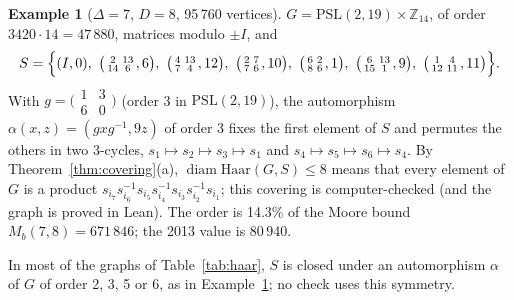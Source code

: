 \documentclass[11pt]{amsart}
\theoremstyle{definition}
\newtheorem{example}[theorem]{Example}
\theoremstyle{remark}
\numberwithin{equation}{section}
\newcommand{\Z}{\mathbb Z}
\newcommand{\Mb}{M_b}
\newcommand{\diam}{\operatorname{diam}}
\newcommand{\PSL}{\mathrm{PSL}}
\begin{document}
\begin{example}[$\Delta=7$, $D=8$, 95\,760 vertices]\label{ex:haar78}
$G=\PSL(2,19)\times\Z_{14}$, of order $3420\cdot14=47\,880$, matrices modulo $\pm I$, and
\[
S=\Bigl\{(I,0),\ \bigl(\begin{smallmatrix}2&13\\14&6\end{smallmatrix},6\bigr),\ \bigl(\begin{smallmatrix}4&13\\7&4\end{smallmatrix},12\bigr),\
\bigl(\begin{smallmatrix}2&7\\7&6\end{smallmatrix},10\bigr),\ \bigl(\begin{smallmatrix}6&2\\8&6\end{smallmatrix},1\bigr),\
\bigl(\begin{smallmatrix}6&13\\15&1\end{smallmatrix},9\bigr),\ \bigl(\begin{smallmatrix}1&4\\12&11\end{smallmatrix},11\bigr)\Bigr\}.
\]
With $g=\bigl(\begin{smallmatrix}1&3\\6&0\end{smallmatrix}\bigr)$ (order 3 in $\PSL(2,19)$), the automorphism
$\alpha(x,z)=(gxg^{-1},9z)$ of order 3 fixes the first element of $S$ and permutes the others in two 3-cycles, $s_1\mapsto
s_2\mapsto s_3\mapsto s_1$ and $s_4\mapsto s_5\mapsto s_6\mapsto s_4$. By Theorem~\ref{thm:covering}(a), $\diam \mathrm{Haar}(G,S)\le8$ means
that every element of $G$ is a product $s_{i_7}s_{i_6}^{-1}s_{i_5}s_{i_4}^{-1}s_{i_3}s_{i_2}^{-1}s_{i_1}$; this covering is
computer-checked (and the graph is proved in Lean). The order is 14.3\% of the Moore bound $\Mb(7,8)=671\,846$; the 2013 value
is 80\,940.
\end{example}

In most of the graphs of Table~\ref{tab:haar}, $S$ is closed under an automorphism $\alpha$ of $G$ of order 2, 3, 5 or 6, as
in Example~\ref{ex:haar78}; no check uses this symmetry.
\end{document}

